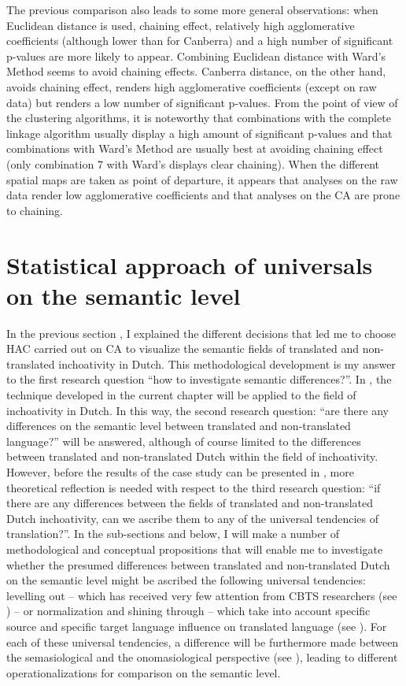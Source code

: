 The previous comparison also leads to some more general observations: when Euclidean distance is used, chaining effect, relatively high agglomerative coefficients (although lower than for Canberra) and a high number of significant p-values are more likely to appear. Combining Euclidean distance with Ward’s Method seems to avoid chaining effects. Canberra distance, on the other hand, avoids chaining effect, renders high agglomerative coefficients (except on raw data) but renders a low number of significant p-values. From the point of view of the clustering algorithms, it is noteworthy that combinations with the complete linkage algorithm usually display a high amount of significant p-values and that combinations with Ward’s Method are usually best at avoiding chaining effect (only combination 7 with Ward’s displays clear chaining). When the different spatial maps are taken as point of departure, it appears that analyses on the raw data render low agglomerative coefficients and that analyses on the CA are prone to chaining.


\section{\label{sec:3.8}  Statistical approach of universals on the semantic level}

In the previous section , I explained the different decisions that led me to choose HAC carried out on CA to visualize the semantic fields of translated and non-translated inchoativity in Dutch. This methodological development is my answer to the first research question “how to investigate semantic differences?”. In , the technique developed in the current chapter will be applied to the field of inchoativity in Dutch. In this way, the second research question: “are there any differences on the semantic level between translated and non-translated language?” will be answered, although of course limited to the differences between translated and non-translated Dutch within the field of inchoativity. However, before the results of the case study can be presented in , more theoretical reflection is needed with respect to the third research question: “if there are any differences between the fields of translated and non-translated Dutch inchoativity, can we ascribe them to any of the universal tendencies of translation?”. In the sub-sections  and  below, I will make a number of methodological and conceptual propositions that will enable me to investigate whether the presumed differences between translated and non-translated Dutch on the semantic level might be ascribed the following universal tendencies: levelling out – which has received very few attention from CBTS researchers (see ) – or normalization and shining through – which take into account specific source and specific target language influence on translated language (see ). For each of these universal tendencies, a difference will be furthermore made between the semasiological and the onomasiological perspective (see ), leading to different operationalizations for comparison on the semantic level.


